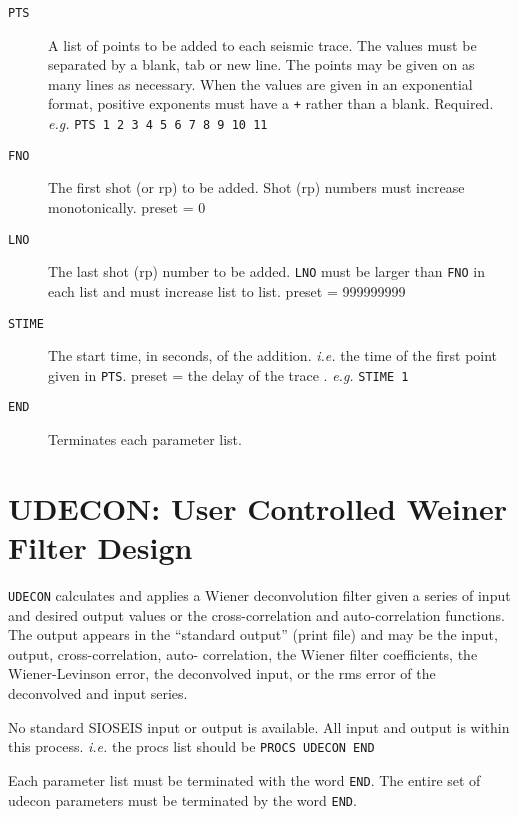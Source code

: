 \begin{description}
\item[\texttt{PTS}] A list of points to be added to each seismic trace.  The
        values must be separated by a blank, tab or new line.
        The points may be given on as many lines as necessary.
        When the values are given in an exponential format,
        positive exponents must have a \texttt{+} rather than a blank.
        Required. \textit{e.g.} \texttt{PTS 1 2 3 4 5 6 7 8 9 10 11}

\item[\texttt{FNO}] The first \gls{shot} (or \gls{rp}) to be added.  Shot (\gls{rp}) numbers
        must increase monotonically.
        \Gls{preset} = 0

\item[\texttt{LNO}] The last \gls{shot} (\gls{rp}) number to be added.  \texttt{LNO} must be
        larger than \texttt{FNO} in each list and must increase list to list.
        \Gls{preset} = 999999999

\item[\texttt{STIME}] The start time, in seconds, of the addition.  \textit{i.e.} the time of
        the first point given in \texttt{PTS}.
        \Gls{preset} = the delay of the trace . \textit{e.g.} \texttt{STIME 1}

\item[\texttt{END}] Terminates each parameter list.
\end{description}

\section{UDECON: User Controlled Weiner Filter Design}
\label{cmd_udecon}

\texttt{UDECON} calculates and applies a Wiener deconvolution filter given a
series of input and desired output values or the cross-correlation and
auto-correlation functions.  The output appears in the ``standard output''
(print file) and may be the input, output, cross-correlation, auto-
correlation, the Wiener filter coefficients, the Wiener-Levinson error,
the deconvolved input, or the rms error of the deconvolved and input
series.

No standard SIOSEIS input or output is available.  All input and output
is within this process.  \textit{i.e.} the procs list should be \texttt{PROCS UDECON END}

Each parameter list must be terminated with the word \texttt{END}.  The entire set
of udecon parameters must be terminated by the word \texttt{END}.

